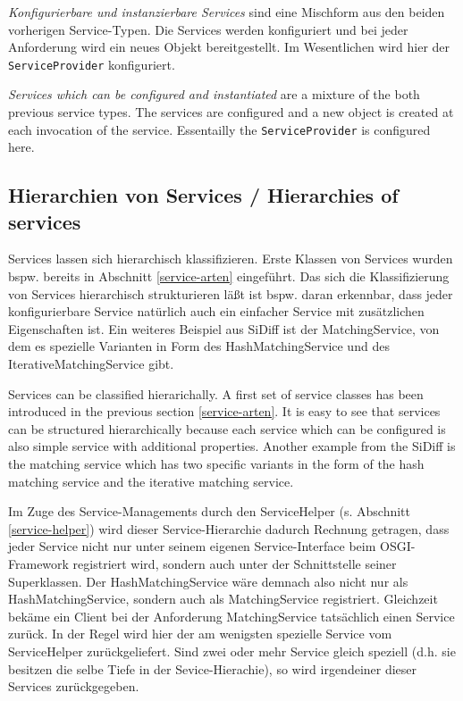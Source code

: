 \documentclass[10pt,a4paper]{scrartcl}
\providecommand{\deng}[2]{#1 / {\sffamily #2}}
\providecommand{\deutsch}[1]{#1}
\providecommand{\englisch}[1]{{\sffamily #1}}
\begin{document}
\deutsch{\emph{Konfigurierbare und instanzierbare Services} sind eine Mischform
aus den beiden vorherigen Service-Typen. Die Services werden konfiguriert und
bei jeder Anforderung wird ein neues Objekt bereitgestellt. Im Wesentlichen wird
hier der \texttt{ServiceProvider} konfiguriert.}

\englisch{\emph{Services which can be configured and instantiated} are a mixture
of the both previous service types. The services are configured and a new object
is created at each invocation of the service. Essentailly the
\texttt{ServiceProvider} is configured here.}

\subsection{\deng{Hierarchien von Services}{Hierarchies of services}}
\deutsch{Services lassen sich hierarchisch klassifizieren. Erste Klassen von
Services wurden bspw. bereits in Abschnitt \ref{service-arten} eingeführt. Das
sich die Klassifizierung von Services hierarchisch strukturieren läßt ist bspw.
daran erkennbar, dass jeder konfigurierbare Service natürlich auch ein einfacher
Service mit zusätzlichen Eigenschaften ist. Ein weiteres Beispiel aus SiDiff ist
der MatchingService, von dem es spezielle Varianten in Form des
HashMatchingService und des IterativeMatchingService gibt.}

\englisch{Services can be classified hierarichally. A first set of service
classes has been introduced in the previous section \ref{service-arten}. It is
easy to see that services can be structured hierarchically because each service
which can be configured is also simple service with additional properties.
Another example from the SiDiff is the matching service which has two specific
variants in the form of the hash matching service and the iterative matching
service.}

\deutsch{Im Zuge des Service-Managements durch den ServiceHelper (s. Abschnitt
\ref{service-helper}) wird dieser Service-Hierarchie dadurch Rechnung getragen,
dass jeder Service nicht nur unter seinem eigenen Service-Interface beim
OSGI-Framework registriert wird, sondern auch unter der Schnittstelle seiner
Superklassen. Der HashMatchingService wäre demnach also nicht nur als
HashMatchingService, sondern auch als MatchingService registriert. Gleichzeit
bekäme ein Client bei der Anforderung MatchingService tatsächlich einen Service
zurück. In der Regel wird hier der am wenigsten spezielle Service vom
ServiceHelper zurückgeliefert. Sind zwei oder mehr Service gleich speziell (d.h.
sie besitzen die selbe Tiefe in der Sevice-Hierachie), so wird irgendeiner dieser
Services zurückgegeben.}
\end{document}
